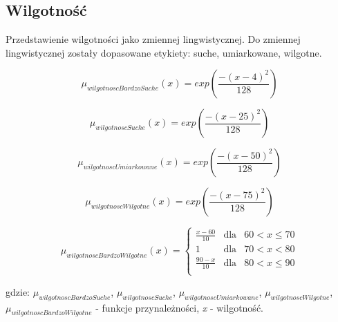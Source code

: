 \documentclass{classrep}
\begin{document}
\subsection{Wilgotność}
Przedstawienie wilgotności jako zmiennej lingwistycznej. Do zmiennej lingwistycznej zostały dopasowane etykiety: suche, umiarkowane, wilgotne. 

\begin{equation}
\mu _{wilgotnoscBardzoSuche}(x) =   exp( \frac{- (x - 4)^2}{128} )
\end{equation}

\begin{equation}
\mu _{wilgotnoscSuche}(x) =   exp( \frac{- (x - 25)^2}{128} )
\end{equation}

\begin{equation}
\mu _{wilgotnoscUmiarkowane}(x) =   exp( \frac{- (x - 50)^2}{128} )
\end{equation}

\begin{equation}
\mu _{wilgotnoscWilgotne}(x) =   exp( \frac{- (x - 75)^2}{128} )
\end{equation}

\begin{equation}
\mu _{wilgotnoscBardzoWilgotne}(x) =  \left\{ \begin{array}{rcl}
\frac{x - 60}{10} & \mbox{dla} & 60 < x \leq 70\\
1 & \mbox{dla} & 70 < x < 80\\
\frac{90 - x}{10} & \mbox{dla} & 80 < x \leq 90\\
\end{array}\right.
\end{equation}

gdzie: \(\mu _{wilgotnoscBardzoSuche}\), \(\mu _{wilgotnoscSuche}\), \(\mu _{wilgotnoscUmiarkowane}\), \(\mu _{wilgotnoscWilgotne}\), \(\mu _{wilgotnoscBardzoWilgotne}\) - funkcje przynależności, \textit{x} - wilgotność. 
\end{document}
